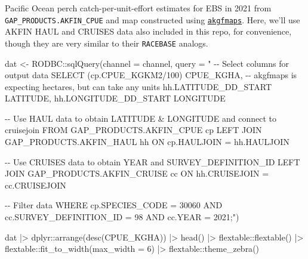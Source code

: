 \documentclass[
  letterpaper,
  oneside,
  open=any]{scrbook}
\newenvironment{Shaded}{\begin{snugshade}}{\end{snugshade}}
\newcommand{\AttributeTok}[1]{\textcolor[rgb]{0.40,0.45,0.13}{#1}}
\newcommand{\DecValTok}[1]{\textcolor[rgb]{0.68,0.00,0.00}{#1}}
\newcommand{\FunctionTok}[1]{\textcolor[rgb]{0.28,0.35,0.67}{#1}}
\newcommand{\NormalTok}[1]{\textcolor[rgb]{0.00,0.23,0.31}{#1}}
\newcommand{\OtherTok}[1]{\textcolor[rgb]{0.00,0.23,0.31}{#1}}
\newcommand{\SpecialCharTok}[1]{\textcolor[rgb]{0.37,0.37,0.37}{#1}}
\newcommand{\StringTok}[1]{\textcolor[rgb]{0.13,0.47,0.30}{#1}}
\begin{document}
Pacific Ocean perch catch-per-unit-effort estimates for EBS in 2021 from
\texttt{GAP\_PRODUCTS.AKFIN\_CPUE} and map constructed using
\href{https://github.com/afsc-gap-products/akgfmaps}{\texttt{akgfmaps}}.
Here, we'll use AKFIN HAUL and CRUISES data also included in this repo,
for convenience, though they are very similar to their \texttt{RACEBASE}
analogs.

\begin{Shaded}
\begin{Highlighting}[]
\NormalTok{dat }\OtherTok{\textless{}{-}}\NormalTok{ RODBC}\SpecialCharTok{::}\FunctionTok{sqlQuery}\NormalTok{(}\AttributeTok{channel =}\NormalTok{ channel, }
                       \AttributeTok{query =} 
                         \StringTok{"}
\StringTok{{-}{-} Select columns for output data}
\StringTok{SELECT }
\StringTok{(cp.CPUE\_KGKM2/100) CPUE\_KGHA, {-}{-} akgfmaps is expecting hectares, but can take any units}
\StringTok{hh.LATITUDE\_DD\_START LATITUDE,}
\StringTok{hh.LONGITUDE\_DD\_START LONGITUDE}

\StringTok{{-}{-} Use HAUL data to obtain LATITUDE \& LONGITUDE and connect to cruisejoin}
\StringTok{FROM GAP\_PRODUCTS.AKFIN\_CPUE cp}
\StringTok{LEFT JOIN GAP\_PRODUCTS.AKFIN\_HAUL hh}
\StringTok{ON cp.HAULJOIN = hh.HAULJOIN}

\StringTok{{-}{-} Use CRUISES data to obtain YEAR and SURVEY\_DEFINITION\_ID}
\StringTok{LEFT JOIN GAP\_PRODUCTS.AKFIN\_CRUISE cc}
\StringTok{ON hh.CRUISEJOIN = cc.CRUISEJOIN}

\StringTok{{-}{-} Filter data}
\StringTok{WHERE cp.SPECIES\_CODE = 30060 }
\StringTok{AND cc.SURVEY\_DEFINITION\_ID = 98 }
\StringTok{AND cc.YEAR = 2021;"}\NormalTok{)}
\end{Highlighting}
\end{Shaded}

\begin{Shaded}
\begin{Highlighting}[]
\NormalTok{dat }\SpecialCharTok{|\textgreater{}} 
\NormalTok{  dplyr}\SpecialCharTok{::}\FunctionTok{arrange}\NormalTok{(}\FunctionTok{desc}\NormalTok{(CPUE\_KGHA)) }\SpecialCharTok{|\textgreater{}} 
  \FunctionTok{head}\NormalTok{() }\SpecialCharTok{|\textgreater{}} 
\NormalTok{  flextable}\SpecialCharTok{::}\FunctionTok{flextable}\NormalTok{() }\SpecialCharTok{|\textgreater{}}  
\NormalTok{  flextable}\SpecialCharTok{::}\FunctionTok{fit\_to\_width}\NormalTok{(}\AttributeTok{max\_width =} \DecValTok{6}\NormalTok{) }\SpecialCharTok{|\textgreater{}} 
\NormalTok{  flextable}\SpecialCharTok{::}\FunctionTok{theme\_zebra}\NormalTok{()}
\end{Highlighting}
\end{Shaded}
\end{document}

